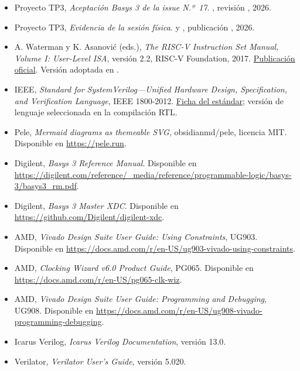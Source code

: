 \begin{itemize}
  \item Proyecto TP3, \textit{Aceptación Basys 3 de la issue N.º~17}.
    ,
    revisión , 2026.
  \item Proyecto TP3, \textit{Evidencia de la sesión física}.
     y
    ,
    publicación , 2026.
  \item A. Waterman y K. Asanović (eds.), \textit{The RISC-V Instruction Set
    Manual, Volume I: User-Level ISA}, versión 2.2, RISC-V Foundation, 2017.
    \href{https://github.com/riscv/riscv-isa-manual/releases/tag/riscv-user-2.2}{Publicación oficial}.
    Versión adoptada en .
  \item IEEE, \textit{Standard for SystemVerilog---Unified Hardware Design,
    Specification, and Verification Language}, IEEE 1800-2012.
    \href{https://standards.ieee.org/ieee/1800/4934/}{Ficha del estándar};
    versión de lenguaje seleccionada en la compilación RTL.
  \item Pele, \textit{Mermaid diagrams as themeable SVG}, obsidianmd/pele,
    licencia MIT. Disponible en \url{https://pele.run}.
  \item Digilent, \textit{Basys 3 Reference Manual}. Disponible en
    \url{https://digilent.com/reference/_media/reference/programmable-logic/basys-3/basys3_rm.pdf}.
  \item Digilent, \textit{Basys 3 Master XDC}. Disponible en
    \url{https://github.com/Digilent/digilent-xdc}.
  \item AMD, \textit{Vivado Design Suite User Guide: Using Constraints}, UG903.
    Disponible en \url{https://docs.amd.com/r/en-US/ug903-vivado-using-constraints}.
  \item AMD, \textit{Clocking Wizard v6.0 Product Guide}, PG065. Disponible en
    \url{https://docs.amd.com/r/en-US/pg065-clk-wiz}.
  \item AMD, \textit{Vivado Design Suite User Guide: Programming and Debugging},
    UG908. Disponible en
    \url{https://docs.amd.com/r/en-US/ug908-vivado-programming-debugging}.
  \item Icarus Verilog, \textit{Icarus Verilog Documentation}, versión 13.0.
  \item Verilator, \textit{Verilator User's Guide}, versión 5.020.
\end{itemize}
\endgroup
